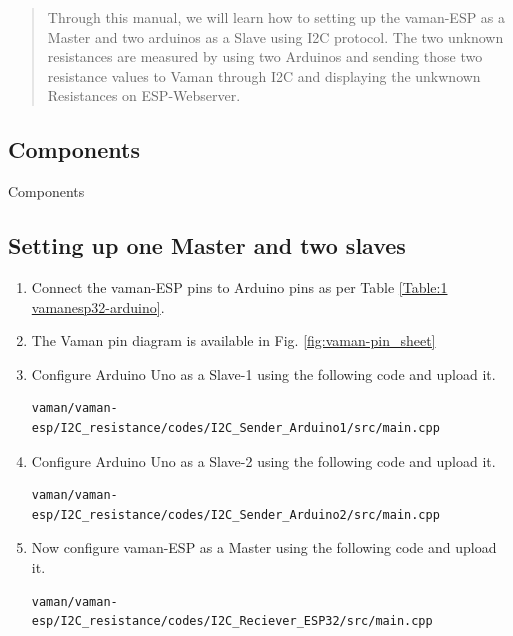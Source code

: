 \begin{abstract}
Through this manual, we will learn how to setting up the vaman-ESP as a Master and two arduinos as a Slave using I2C protocol. The two unknown resistances are measured by using two Arduinos and sending those two resistance values to Vaman through I2C and displaying the unkwnown Resistances on ESP-Webserver.
\end{abstract}
\subsection{Components}
\begin{table}[H]
\centering

\caption{Components}
\label{table:}
\end{table}
\subsection{Setting up one Master and two slaves}
\begin{enumerate}[label=\thesection.\arabic*.,ref=\thesection.\theenumi]
\item
Connect the vaman-ESP pins to Arduino pins as per Table \ref{Table:1 vamanesp32-arduino}.
\begin{table}[H]
\centering

\caption{}
\label{Table:1 vamanesp32-arduino}
\end{table}
\item The Vaman pin diagram is available in Fig. \ref{fig:vaman-pin_sheet}
\item
Configure Arduino Uno as a Slave-1 using the following code and upload it.\\
\begin{lstlisting}
vaman/vaman-esp/I2C_resistance/codes/I2C_Sender_Arduino1/src/main.cpp
\end{lstlisting}

\item
Configure Arduino Uno as a Slave-2 using the following code and upload it.\\
\begin{lstlisting}
vaman/vaman-esp/I2C_resistance/codes/I2C_Sender_Arduino2/src/main.cpp
\end{lstlisting}

\item
Now configure vaman-ESP as a Master using the following code and upload it.\\
\begin{lstlisting}
vaman/vaman-esp/I2C_resistance/codes/I2C_Reciever_ESP32/src/main.cpp
\end{lstlisting}
\end{enumerate}
